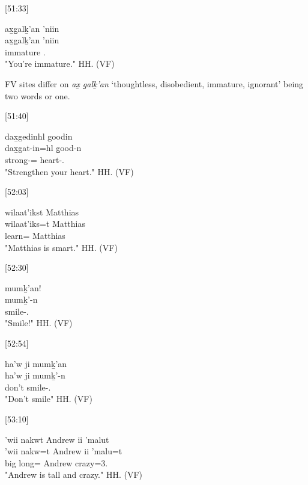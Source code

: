 [51:33]
\begin{exe}
    \ex \glll
    ax̱g̱alḵ'an 'niin \\
    ax̱g̱alḵ'an 'niin \\
    immature \Ssg.\Iii \\
    \glt "You're immature." \hfill HH.\ElicitationDate{} (VF)
\end{exe}

FV sites differ on \textit{ax̱ g̱alḵ'an} `thoughtless, disobedient, immature, ignorant' being two words or one. 

[51:40]
\begin{exe}
    \ex \glll
    dax̱gedinhl g̱oodin \\
    dax̱gat-in=hl g̱ood-n \\    
    strong-=\Cn{} heart-\Ssg.\Ii \\
    \glt "Strengthen your heart." \hfill HH.\ElicitationDate{} (VF)
\end{exe}

[52:03]
\begin{exe}
    \ex \glll
    wilaat'ikst Matthias \\
    wilaat'iks=t Matthias \\
    learn=\Pn{} Matthias \\
    \glt "Matthias is smart." \hfill HH.\ElicitationDate{} (VF)
\end{exe}

[52:30]
\begin{exe}
    \ex \glll
    mumḵ’an! \\
    mumḵ’-n\\
    smile-\Ssg.\Ii \\
    \glt "Smile!" \hfill HH.\ElicitationDate{} (VF)
\end{exe}

[52:54]
\begin{exe}
    \ex \glll
    ha'w ji mumḵ’an \\
    ha'w ji mumḵ’-n  \\
    don't \Irr{} smile-\Ssg.\Ii \\
    \glt "Don't smile" \hfill HH.\ElicitationDate{} (VF)
\end{exe}

[53:10]
\begin{exe}
    \ex \glll
    'wii nakwt Andrew ii 'malut \\
    'wii nakw=t Andrew ii 'malu=t \\
    big long=\Pn{} Andrew \Ccnj{} crazy=3.\Ii \\
    \glt "Andrew is tall and crazy." \hfill HH.\ElicitationDate{} (VF)
\end{exe}

